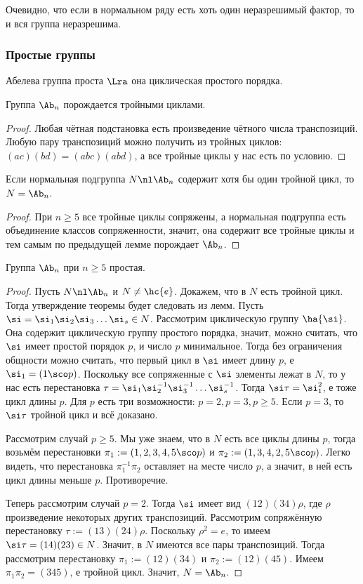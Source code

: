 \documentclass[a4paper]{article}
\begin{document}
Очевидно, что если в нормальном ряду есть хоть один неразрешимый фактор, то и вся группа неразрешима.

\subsubsection{Простые группы}

Абелева группа проста $\Lra$ она циклическая простого порядка.

\begin{lemma}
Группа $\Ab_n$ порождается тройными циклами.
\end{lemma}
\begin{proof}
Любая чётная подстановка есть произведение чётного числа транспозиций. Любую пару транспозиций можно
получить из тройных циклов: $(ac)(bd)=(abc)(abd)$, а все тройные циклы у нас есть по условию.
\end{proof}

\begin{lemma}
Если нормальная подгруппа $N \nl \Ab_n$ содержит хотя бы один тройной цикл, то $N = \Ab_n$.
\end{lemma}
\begin{proof}
При $n \ge 5$ все тройные циклы сопряжены, а нормальная подгруппа есть объединение классов сопряженности,
значит, она содержит все тройные циклы и тем самым по предыдущей лемме порождает $\Ab_n$.
\end{proof}

\begin{theorem}
Группа $\Ab_n$ при $n \ge 5$ простая.
\end{theorem}
\begin{proof}
Пусть $N \nl \Ab_n$ и $N \neq \hc{e}$. Докажем, что в $N$ есть тройной цикл. Тогда утверждение теоремы  будет
следовать из лемм. Пусть $\si = \si_1\si_2\si_3 \ldots \si_s \in N$. Рассмотрим циклическую
группу $\ha{\si}$. Она содержит циклическую группу простого порядка, значит, можно считать, что $\si$
имеет простой порядок $p$, и число $p$ минимальное. Тогда без ограничения общности можно считать, что
первый цикл в $\si$ имеет длину $p$, е $\si_1 = (1 \sco p)$. Поскольку все сопряженные с $\si$
элементы лежат в $N$, то у нас есть перестановка $\tau=\si_1\si_2^{-1}\si_3^{-1} \ldots
\si_s^{-1}$. Тогда $\si\tau = \si_1^2$, е тоже цикл длины $p$. Для $p$ есть три возможности:
$p=2, p=3, p \ge 5$. Если $p=3$, то $\si\tau$ тройной цикл и всё доказано.

Рассмотрим случай $p \ge 5$. Мы уже знаем, что в $N$ есть все циклы длины $p$, тогда возьмём перестановки
$\pi_1:=(1,2,3,4,5 \sco p)$ и $\pi_2:=(1,3,4,2,5 \sco p)$. Легко  видеть, что перестановка $\pi_1^{-1}\pi_2$
оставляет на месте число $p$, а значит, в ней есть цикл длины меньше $p$. Противоречие.

Теперь рассмотрим случай $p=2$. Тогда $\si$ имеет вид $(12)(34)\rho$, где $\rho$ произведение
некоторых других транспозиций. Рассмотрим сопряжённую перестановку $\tau:=(13)(24)\rho$. Поскольку
$\rho^2=e$, то имеем $\si\tau = (14)(23) \in N$. Значит, в $N$ имеются все пары транспозиций. Тогда
рассмотрим перестановку $\pi_1 := (12)(34)$ и $\pi_2:=(12)(45)$. Имеем $\pi_1\pi_2 = (345)$, е тройной
цикл. Значит, $N=\Ab_n$.
\end{proof}
\end{document}
